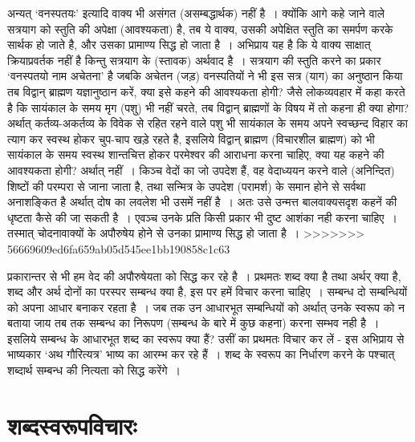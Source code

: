 अन्यत् ‘वनस्पतयः' इत्यादि वाक्य भी असंगत (असम्बद्धार्थक) नहीं है~। क्योंकि आगे कहे जाने वाले सत्रयाग को स्तुति की अपेक्षा (आवश्यकता) है, तब ये वाक्य, उसकी अपेक्षित स्तुति का समर्पण करके सार्थक हो जाते है, और उसका प्रामाण्य सिद्ध हो जाता है~। अभिप्राय यह है कि ये वाक्य साक्षात् क्रियाप्रवर्तक नहीं है किन्तु सत्रयाग के (स्तावक) अर्थवाद है~। सत्रयाग की स्तुति करने का प्रकार ‘वनस्पतयो नाम अचेतना' है जबकि अचेतन (जड़) वनस्पतियों ने भी इस सत्र (याग) का अनुष्ठान किया तब विद्वान् ब्राह्मण यज्ञानुष्ठान करें, क्या इसे कहने की आवश्यकता होगी? जैसे लोकव्यवहार में कहा करते है कि सायंकाल के समय मृग (पशु) भी नहीं चरते, तब विद्वान् ब्राह्मणों के विषय में तो कहना ही क्या होगा? अर्थात् कर्तव्य-अकर्तव्य के विवेक से रहित रहने वाले पशु भी सायंकाल के समय अपने स्वच्छन्द विहार का त्याग कर स्वस्थ होकर चुप-चाप खड़े रहते है, इसलिये विद्वान् ब्राह्मण (विचारशील ब्राह्मण) को भी सायंकाल के समय स्वस्थ शान्तचित्त होकर परमेश्वर की आराधना करना चाहिए, क्या यह कहने की आवश्यकता होगी? अर्थात् नहीं~। किञ्च वेदों का जो उपदेश हैं, वह वेदाध्ययन करने वाले (अनिन्दित) शिष्टों की परम्परा से जाना जाता है, तथा सन्मित्र के उपदेश (परामर्श) के समान होने से सर्वथा अनाशङ्कित है अर्थात् दोष का लवलेश भी उसमें नहीं है~। अतः उसे उन्मत्त बालवाक्यसदृश कहनें की धृष्टता कैसे की जा सकती है~। एवञ्च उनके प्रति किसी प्रकार भी दुष्ट आशंका नही करना चाहिए~। तस्मात् चोदनावाक्यों के अपौरुषेय होने से उनका प्रामाण्य सिद्ध हो जाता है~।
>>>>>>> 56669609ed6fa659ab05d545ee1bb190858c1c63

प्रकारान्तर से भी हम वेद की अपौरुषेयता को सिद्ध कर रहे है~। प्रथमतः शब्द क्या है तथा अर्थर् क्या है, शब्द और अर्थ दोनों का परस्पर सम्बन्ध क्या है, इस पर हमें विचार करना चाहिए~। सम्बन्ध दो सम्बन्धियों को अपना आधार बनाकर रहता है~। जब तक उन आधारभूत सम्बन्धियों को अर्थात् उनके स्वरूप को न बताया जाय तब तक सम्बन्ध का निरूपण (सम्बन्ध के बारे में कुछ कहना) करना सम्भव नही है~। इसलिये सम्बन्ध के आधारभूत शब्द का स्वरूप क्या हैं? उसीं का प्रथमतः विचार कर लें - इस अभिप्राय से भाष्यकार ‘अथ गौरित्यत्र' भाष्य का आरम्भ कर रहे हैं~। शब्द के स्वरूप का निर्धारण करने के पश्चात् शब्दार्थ सम्बन्ध की नित्यता को सिद्ध करेंगे~।

\vskip -1cm


\section*{शब्दस्वरूपविचारः}

\vskip -6pt

